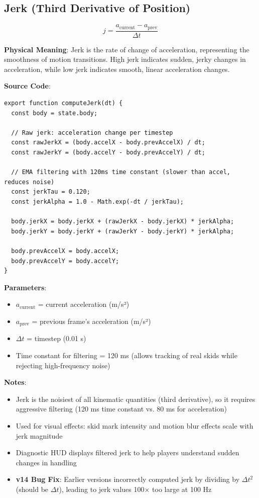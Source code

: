 \subsection{Jerk (Third Derivative of Position)}

\begin{equation}
  j = \frac{a_{\text{current}} - a_{\text{prev}}}{\Delta t}
  \label{eq:jerk}
\end{equation}

\textbf{Physical Meaning}: Jerk is the rate of change of acceleration, representing the smoothness of motion transitions. High jerk indicates sudden, jerky changes in acceleration, while low jerk indicates smooth, linear acceleration changes.

\textbf{Source Code}: 

\begin{lstlisting}[caption={Jerk computation with noise filtering}]
export function computeJerk(dt) {
  const body = state.body;

  // Raw jerk: acceleration change per timestep
  const rawJerkX = (body.accelX - body.prevAccelX) / dt;
  const rawJerkY = (body.accelY - body.prevAccelY) / dt;

  // EMA filtering with 120ms time constant (slower than accel, reduces noise)
  const jerkTau = 0.120;
  const jerkAlpha = 1.0 - Math.exp(-dt / jerkTau);

  body.jerkX = body.jerkX + (rawJerkX - body.jerkX) * jerkAlpha;
  body.jerkY = body.jerkY + (rawJerkY - body.jerkY) * jerkAlpha;

  body.prevAccelX = body.accelX;
  body.prevAccelY = body.accelY;
}
\end{lstlisting}

\textbf{Parameters}:
\begin{itemize}
  \item $a_{\text{current}}$ = current acceleration (m/s²)
  \item $a_{\text{prev}}$ = previous frame's acceleration (m/s²)
  \item $\Delta t$ = timestep (0.01 s)
  \item Time constant for filtering = 120 ms (allows tracking of real skids while rejecting high-frequency noise)
\end{itemize}

\textbf{Notes}:
\begin{itemize}
  \item Jerk is the noisiest of all kinematic quantities (third derivative), so it requires aggressive filtering (120 ms time constant vs. 80 ms for acceleration)
  \item Used for visual effects: skid mark intensity and motion blur effects scale with jerk magnitude
  \item Diagnostic HUD displays filtered jerk to help players understand sudden changes in handling
  \item \textbf{v14 Bug Fix}: Earlier versions incorrectly computed jerk by dividing by $\Delta t^2$ (should be $\Delta t$), leading to jerk values 100× too large at 100 Hz
\end{itemize}

